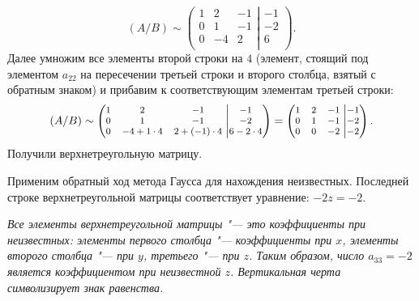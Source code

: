 \documentclass[10pt]{article}
\numberwithin{primer}{section}
\numberwithin{equation}{section}
\begin{document}
\begin{equation*}
\left(A/B\right)\sim\left(\begin{matrix}
1 & 2 & -1 \\
0 & 1 & -1 \\
0 & -4 & 2 \\
\end{matrix}\right.\left|\begin{matrix}
-1 \\
-2 \\
6 \\
\end{matrix}\right).
\end{equation*}
Далее умножим все элементы второй строки на $4$ (элемент, стоящий под элементом $a_{22}$ на пересечении третьей строки и второго столбца,
взятый с обратным знаком) и прибавим к соответствующим элементам третьей строки:
\begin{equation*}\footnotesize
\left(A/B\right)\sim\left(\begin{matrix}
1 & 2 & -1 \\
0 & 1 & -1 \\
0 & -4+1\cdot4 & 2+(-1)\cdot4 \\
\end{matrix}\right.\left|\begin{matrix}
-1 \\
-2 \\
6-2\cdot4 \\
\end{matrix}\right)
=\left(\begin{matrix}
1 & 2 & -1 \\
0 & 1 & -1 \\
0 & 0 & -2 \\
\end{matrix}\right.\left|\begin{matrix}
-1 \\
-2 \\
-2 \\
\end{matrix}\right).
\end{equation*}
Получили верхнетреугольную матрицу.

Применим обратный ход метода Гаусса для нахождения не\-известных. Последней строке верхнетреугольной матрицы соответствует уравнение:
$-2z=-2$.

\emph{Все элементы верхнетреугольной матрицы "--- это коэффициенты при неизвестных: элементы первого столбца "--- коэффициенты при $x$,
	элементы второго столбца "--- при $y$, третьего "--- при $z$. Таким образом, число $a_{33}=-2$ является коэффициентом при неизвестной $z$.
	Вертикальная черта символизирует знак равенства.}
\end{document}
